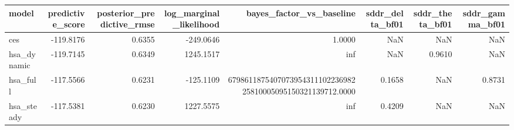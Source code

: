 \begin{tabular}{lrrrrrrr}
\toprule
model & predictive\_score & posterior\_predictive\_rmse & log\_marginal\_likelihood & bayes\_factor\_vs\_baseline & sddr\_delta\_bf01 & sddr\_theta\_bf01 & sddr\_gamma\_bf01 \\
\midrule
ces & -119.8176 & 0.6355 & -249.0646 & 1.0000 & NaN & NaN & NaN \\
hsa\_dynamic & -119.7145 & 0.6349 & 1245.1517 & inf & NaN & 0.9610 & NaN \\
hsa\_full & -117.5566 & 0.6231 & -125.1109 & 679861187540707395431110223698225810005095150321139712.0000 & 0.1658 & NaN & 0.8731 \\
hsa\_steady & -117.5381 & 0.6230 & 1227.5575 & inf & 0.4209 & NaN & NaN \\
\bottomrule
\end{tabular}
